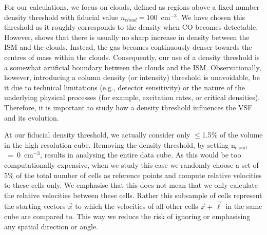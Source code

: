 For our calculations, 
    we focus on clouds, defined as regions above a fixed number density 
    threshold with fiducial value $n_{\mathrm cloud} = 100$~cm$^{-3}$.  We have
    chosen this threshold as it roughly corresponds to the density when CO becomes 
    detectable. 
However,  shows that there is usually no sharp increase in density between the ISM and the clouds. 
Instead, the gas becomes continuously denser towards the centres of mass within the clouds. 
Consequently, 
    our use of 
a density threshold is a 
     somewhat artificial boundary
between the clouds and the ISM. Observationally, however, introducing a 
    column 
density (or intensity) threshold is unavoidable, be it due to technical limitations (e.g., %
     detector sensitivity) 
or the nature of the underlying physical processes (for example, excitation rates, or critical densities).
Therefore, it is important to study 
     how a density threshold influences the VSF and its evolution.

      At our fiducial density threshold, we actually consider
only $\leq$1.5\% of the volume in the high resolution cube.
Removing the density threshold, by setting n$_\mathrm{cloud}$~=~0~cm$^{-3}$, results in analysing the entire data cube.
As this would be too computationally expensive,
     when we study this case
we randomly choose a set of 5\% of the total number of cells as reference points and compute relative velocities to these cells only.
We emphasise that this does not mean that we only calculate the relative velocities between these cells.
Rather this subsample of cells represent the starting vectors $\vec{x}$ to which the velocities of all other cells $\vec{x} + \vec{\ell}$ in the same cube are compared to.
This way we reduce the risk of ignoring or emphasising any spatial direction or angle.


